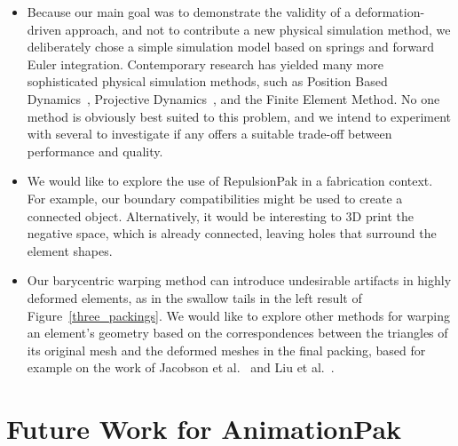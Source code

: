 \begin{itemize}
\item 
	Because our main goal was to demonstrate the validity of a 
	deformation-driven approach, and not to contribute a new
	physical simulation method, we deliberately chose a simple 
	simulation model based on springs and forward Euler integration.
	Contemporary research has yielded many more sophisticated 
	physical simulation methods, such as Position Based Dynamics~\cite{Muller2007}, 
	Projective Dynamics~\cite{Bouaziz2014}, and the Finite Element Method.
	No one method is obviously best suited to this problem, and
	we intend to experiment with several to investigate if any offers
	a suitable trade-off between performance and quality.

\item We would like to explore the use of RepulsionPak in a fabrication context.
      For example, our boundary compatibilities might be used to create a connected object.
      Alternatively, it would be interesting to 3D print the 
      negative space, which is already connected,
	  leaving holes that surround the element shapes.

\item Our barycentric warping method can
	introduce undesirable artifacts in highly deformed elements, as
	in the swallow tails in the left result of Figure~\ref{three_packings}.
	We would like to explore other methods for warping an element's
	geometry based on the correspondences between the triangles of its original
	mesh and the deformed meshes in the final packing, based for example on the
	work of Jacobson et al.~\cite{Jacobson2011} and Liu et al.~\cite{Liu2014}.

\end{itemize}

\section{Future Work for AnimationPak}


